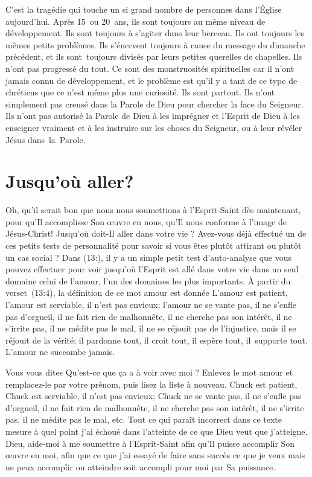 C'est la tragédie qui touche un si grand nombre de personnes
 dans l'Église aujourd'hui. Après 15~ou 20~ans,
 ils sont toujours au même niveau de développement.
 Ils sont toujours à s'agiter dans leur berceau.
 Ils ont toujours les mêmes petits problèmes.
 Ils s'éner\-vent toujours à cause du message du dimanche précédent,
 et ils sont~toujours divisés par leurs petites querelles de chapelles.
 Ils n'ont pas progressé du tout. Ce sont des monstruosités spirituelles
 car il n'ont jamais connu de développement, et le problème est qu'il y a
 tant de ce type de chrétiens que ce n'est même plus une curiosité.
 Ils sont partout. Ils n'ont simplement pas creusé dans la Parole de Dieu
 pour chercher la face du Seigneur. Ils n'ont pas autorisé la Parole de Dieu
 à les imprégner et l'Esprit de Dieu à les enseigner vraiment et
 à les instruire sur les choses du Seigneur,
 ou à leur révéler Jésus dans~la~Parole.


\section{Jusqu'o\`u aller?}

Oh, qu'il serait bon que nous nous soumettions à l'Esprit-Saint
 dès maintenant, pour qu'Il accomplisse Son œuvre en nous,
 qu'Il nous conforme à l'image de Jésus-Christ!
 Jusqu'où doit-Il aller dans votre vie ?
 Avez-vous déjà effectué un de ces petits tests de personnalité pour savoir
 si vous êtes plutôt attirant ou plutôt un cas social ?
 Dans (13:), il y a un simple petit test d'auto-analyse
 que vous pouvez effectuer pour voir jusqu'où l'Esprit est allé
 dans votre vie dans un seul domaine\frcolon{} celui de l'amour,
 l'un des domaines les plus importants.
 À partir du verset~(13:4), la définition
 de ce mot \Og amour \Fg{} est donnée\frcolon{}
 \Og L'amour est patient, l'amour est serviable, il n'est pas envieux;
 l'amour ne se vante pas, il ne s'enfle pas d'orgueil,
 il ne fait rien de malhonnête, il ne cherche pas son intérêt,
 il ne s'irrite pas, il ne médite pas le mal, il ne se réjouit pas
 de l'injustice, mais il se réjouit de la vérité; il pardonne tout,
 il croit tout, il espère tout, il~supporte tout.
 L'amour ne succombe jamais. \Fg{}

Vous vous dites\frcolon{}
 \Og Qu'est-ce que ça a à voir avec moi ? \Fg{}
 Enlevez le mot \Og amour \Fg{} et remplacez-le par votre prénom,
 puis lisez la liste à nouveau.
 \Og Chuck est patient, Chuck est serviable, il n'est pas envieux;
 Chuck ne se vante pas, il ne s'enfle pas d'orgueil, il ne fait rien
 de malhonnête, il ne cherche pas son intérêt, il ne s'irrite pas,
 il ne médite pas le mal, etc. \Fg{}
 Tout ce qui paraît incorrect dans ce texte mesure à quel point j'ai échoué
 dans l'atteinte de ce que Dieu veut que j'atteigne.
 Dieu, aide-moi à me soumettre à l'Esprit-Saint afin qu'Il puisse accomplir
 Son œuvre en moi, afin que ce que j'ai essayé de faire sans succès
 \ocadr ce que je veux mais ne peux accomplir ou atteindre \fcadr
 soit accompli pour moi par Sa puissance.
\closechapter

